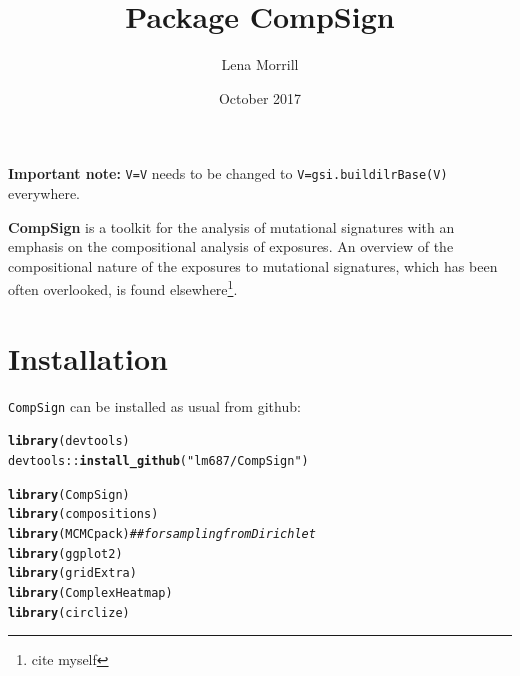 \documentclass{article}\usepackage[]{graphicx}\usepackage[]{color}
\title{Package \textbf{CompSign}}
\author{Lena Morrill}
\date{October 2017}
\makeatletter
\newcommand{\hlstr}[1]{\textcolor[rgb]{0.192,0.494,0.8}{#1}}%
\newcommand{\hlcom}[1]{\textcolor[rgb]{0.678,0.584,0.686}{\textit{#1}}}%
\newcommand{\hlopt}[1]{\textcolor[rgb]{0,0,0}{#1}}%
\newcommand{\hlstd}[1]{\textcolor[rgb]{0.345,0.345,0.345}{#1}}%
\newcommand{\hlkwd}[1]{\textcolor[rgb]{0.737,0.353,0.396}{\textbf{#1}}}%
\newenvironment{kframe}{%
 \def\at@end@of@kframe{}%
 \ifinner\ifhmode%
  \def\at@end@of@kframe{\end{minipage}}%
  \begin{minipage}{\columnwidth}%
 \fi\fi%
 \def\FrameCommand##1{\hskip\@totalleftmargin \hskip-\fboxsep
 \colorbox{shadecolor}{##1}\hskip-\fboxsep
     \hskip-\linewidth \hskip-\@totalleftmargin \hskip\columnwidth}%
 \MakeFramed {\advance\hsize-\width
   \@totalleftmargin\z@ \linewidth\hsize
   \@setminipage}}%
 {\par\unskip\endMakeFramed%
 \at@end@of@kframe}
\newenvironment{knitrout}{}{} %
\makeatother
\begin{document}
\maketitle

\begin{center}
\textbf{Important note: }{\verb|V=V| needs to be changed to \verb|V=gsi.buildilrBase(V)| everywhere.}
\end{center}

\textbf{CompSign} is a toolkit for the analysis of mutational signatures with an emphasis on the compositional analysis of exposures. An overview of the compositional nature of the exposures to mutational signatures, which has been often overlooked, is found elsewhere\footnote{cite myself}.

\tableofcontents





\section{Installation}
\texttt{CompSign} can be installed as usual from github:

\begin{knitrout}
\color{fgcolor}\begin{kframe}
\begin{alltt}
\hlkwd{library}\hlstd{(devtools)}
\hlstd{devtools}\hlopt{::}\hlkwd{install_github}\hlstd{(}\hlstr{"lm687/CompSign"}\hlstd{)}
\end{alltt}
\end{kframe}
\end{knitrout}

\begin{knitrout}
\color{fgcolor}\begin{kframe}
\begin{alltt}
\hlkwd{library}\hlstd{(CompSign)}
\hlkwd{library}\hlstd{(compositions)}
\hlkwd{library}\hlstd{(MCMCpack)}      \hlcom{## for sampling from Dirichlet}
\hlkwd{library}\hlstd{(ggplot2)}
\hlkwd{library}\hlstd{(gridExtra)}
\hlkwd{library}\hlstd{(ComplexHeatmap)}
\hlkwd{library}\hlstd{(circlize)}
\end{alltt}
\end{kframe}
\end{knitrout}
\end{document}
